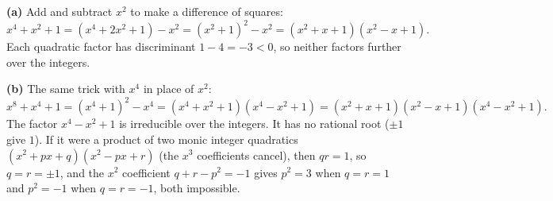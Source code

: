 \textbf{(a)} Add and subtract $x^2$ to make a difference of squares:
\[
x^4+x^2+1=(x^4+2x^2+1)-x^2=(x^2+1)^2-x^2=\boxed{(x^2+x+1)(x^2-x+1)}.
\]
Each quadratic factor has discriminant $1-4=-3<0$, so neither factors further over the integers.

\textbf{(b)} The same trick with $x^4$ in place of $x^2$:
\[
x^8+x^4+1=(x^4+1)^2-x^4=(x^4+x^2+1)(x^4-x^2+1)=\boxed{(x^2+x+1)(x^2-x+1)(x^4-x^2+1)}.
\]
The factor $x^4-x^2+1$ is irreducible over the integers. It has no rational root ($\pm1$ give $1$). If it were a product of two monic integer quadratics $(x^2+px+q)(x^2-px+r)$ (the $x^3$ coefficients cancel), then $qr=1$, so $q=r=\pm1$, and the $x^2$ coefficient $q+r-p^2=-1$ gives $p^2=3$ when $q=r=1$ and $p^2=-1$ when $q=r=-1$, both impossible.
